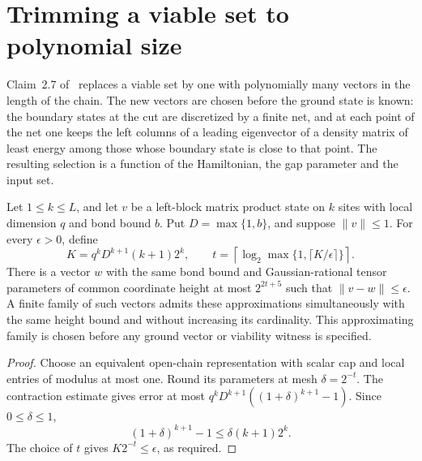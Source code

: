 \section{Trimming a viable set to polynomial size}
\label{sec:lvv_size_trimming}

Claim~2.7 of~\cite{Landau2015Polynomial} replaces a viable set by one with
polynomially many vectors in the length of the chain. The new vectors are
chosen before the ground state is known: the boundary states at the cut are
discretized by a finite net, and at each point of the net one keeps the left
columns of a leading eigenvector of a density matrix of least energy among
those whose boundary state is close to that point. The resulting selection is
a function of the Hamiltonian, the gap parameter and the input set.

\begin{lemma}
    \label{thm:lvv_dyadic_open_mps_approximation}
    \leanok
    Let $1\le k\le L$, and let $v$ be a left-block matrix product
    state on $k$ sites with local dimension $q$ and bond bound $b$. Put
    $D=\max\{1,b\}$, and suppose $\|v\|\le1$. For every $\epsilon>0$, define
    \[
        K=q^k D^{k+1}(k+1)2^k,\qquad
        t=\left\lceil\log_2\max\{1,\lceil K/\epsilon\rceil\}\right\rceil.
    \]
    There is a vector $w$ with the same bond bound and Gaussian-rational
    tensor parameters of common coordinate height at most $2^{2t+5}$ such
    that $\|v-w\|\le\epsilon$.
    A finite family of such vectors admits these approximations
    simultaneously with the same height bound and without increasing its
    cardinality. This approximating family is chosen before any ground
    vector or viability witness is specified.
\end{lemma}
\begin{proof}\leanok
    Choose an equivalent open-chain representation with scalar cap and
    local entries of modulus at most one. Round its parameters at mesh
    $\delta=2^{-t}$. The contraction estimate gives error at most
    $q^kD^{k+1}((1+\delta)^{k+1}-1)$. Since $0\le\delta\le1$,
    \[
        (1+\delta)^{k+1}-1\le\delta(k+1)2^k.
    \]
    The choice of $t$ gives $K2^{-t}\le\epsilon$, as required.
\end{proof}

